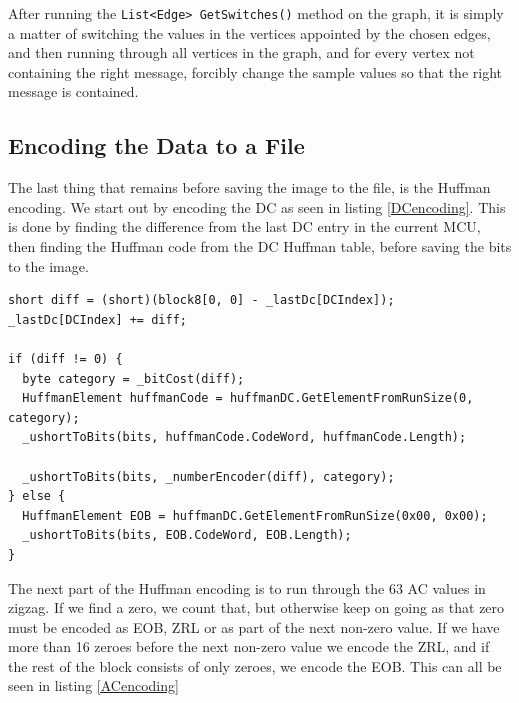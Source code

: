 After running the \lstinline|List<Edge> GetSwitches()| method on the graph, it is simply a matter of switching the values in the vertices appointed by the chosen edges, and then running through all vertices in the graph, and for every vertex not containing the right message, forcibly change the sample values so that the right message is contained.

\subsection{Encoding the Data to a File}

The last thing that remains before saving the image to the file, is the Huffman encoding.
We start out by encoding the DC as seen in listing \ref{DCencoding}.
This is done by finding the difference from the last DC entry in the current MCU, then finding the Huffman code from the DC Huffman table, before saving the bits to the image.

\begin{lstlisting}[firstnumber=792,label=DCencoding,caption={Encoding DC coefficient into the image \textbf{File: }JPEGImage.cs}]
short diff = (short)(block8[0, 0] - _lastDc[DCIndex]);
_lastDc[DCIndex] += diff;

if (diff != 0) {
  byte category = _bitCost(diff);
  HuffmanElement huffmanCode = huffmanDC.GetElementFromRunSize(0, category);
  _ushortToBits(bits, huffmanCode.CodeWord, huffmanCode.Length);

  _ushortToBits(bits, _numberEncoder(diff), category);
} else {
  HuffmanElement EOB = huffmanDC.GetElementFromRunSize(0x00, 0x00);
  _ushortToBits(bits, EOB.CodeWord, EOB.Length);
}
\end{lstlisting}

The next part of the Huffman encoding is to run through the 63 AC values in zigzag.
If we find a zero, we count that, but otherwise keep on going as that zero must be encoded as EOB, ZRL or as part of the next non-zero value.
If we have more than 16 zeroes before the next non-zero value we encode the ZRL, and if the rest of the block consists of only zeroes, we encode the EOB.
This can all be seen in listing \ref{ACencoding}

